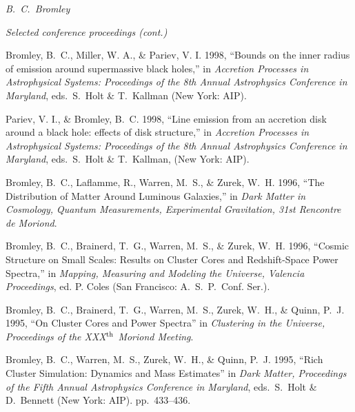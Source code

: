 \documentclass[11pt]{article}
\def\bibsty{\setlength{\parskip}{0pt}
\setlength{\oddsidemargin}{0.33in}
\setlength{\evensidemargin}{0.33in}
\setlength{\parindent}{-0.33in}}
\begin{document}

\newpage
\mbox{} \hfill {\it B.\ C.\ Bromley}
\centerline{\em Selected conference proceedings (cont.)}
\vspace{-5.5pt}
\bibsty

Bromley, B.~C., Miller, W. A., \& Pariev, V. I. 1998, ``Bounds on the
inner radius of emission around supermassive black holes,'' in {\em
Accretion Processes in Astrophysical Systems: Proceedings of the 8th
Annual Astrophysics Conference in Maryland}, eds.\ S.\ Holt \& T.\
Kallman (New York: AIP).

Pariev, V. I., \& Bromley, B.~C. 1998, ``Line emission from an
accretion disk around a black hole: effects of disk structure,'' in
{\em Accretion Processes in Astrophysical Systems: Proceedings of the 8th
Annual Astrophysics Conference in Maryland}, eds.\ S.\ Holt \& T.\
Kallman, (New York: AIP).

Bromley, B.\ C., Laflamme, R., Warren, M.\ S., \& Zurek, W.\ H.  1996,
``The Distribution of Matter Around Luminous Galaxies,''  in
{\em Dark Matter in Cosmology, Quantum Measurements, Experimental
Gravitation, 31st Rencontre de Moriond}.


Bromley, B.\ C., Brainerd, T.\ G., Warren, M.\ S., \& Zurek, W.\ H.
1996, ``Cosmic Structure on Small Scales: Results on Cluster Cores and
Redshift-Space Power Spectra,'' in {\em Mapping, Measuring and
Modeling the Universe, Valencia Proceedings}, ed. P. Coles
(San Francisco: A.\ S.\ P.\ Conf. Ser.).


 Bromley, B.\ C., Brainerd, T.\ G., Warren, M.\ S., 
 Zurek, W.\ H., \& Quinn, P.\ J.
 1995, ``On Cluster Cores and Power Spectra'' in {\em Clustering in the 
 Universe, Proceedings of the XXX$^{\rm th}$ Moriond Meeting}.


Bromley, B.\ C., Warren, M.\ S., Zurek, W.\ H., \& Quinn, P.\ J.
1995, ``Rich Cluster Simulation:
Dynamics and Mass Estimates'' in {\em Dark Matter, Proceedings of
the Fifth Annual Astrophysics Conference in Maryland}, eds.\ 
S.\ Holt \& D.\ Bennett
(New York: AIP).
pp.\ 433--436.

\end{document}
